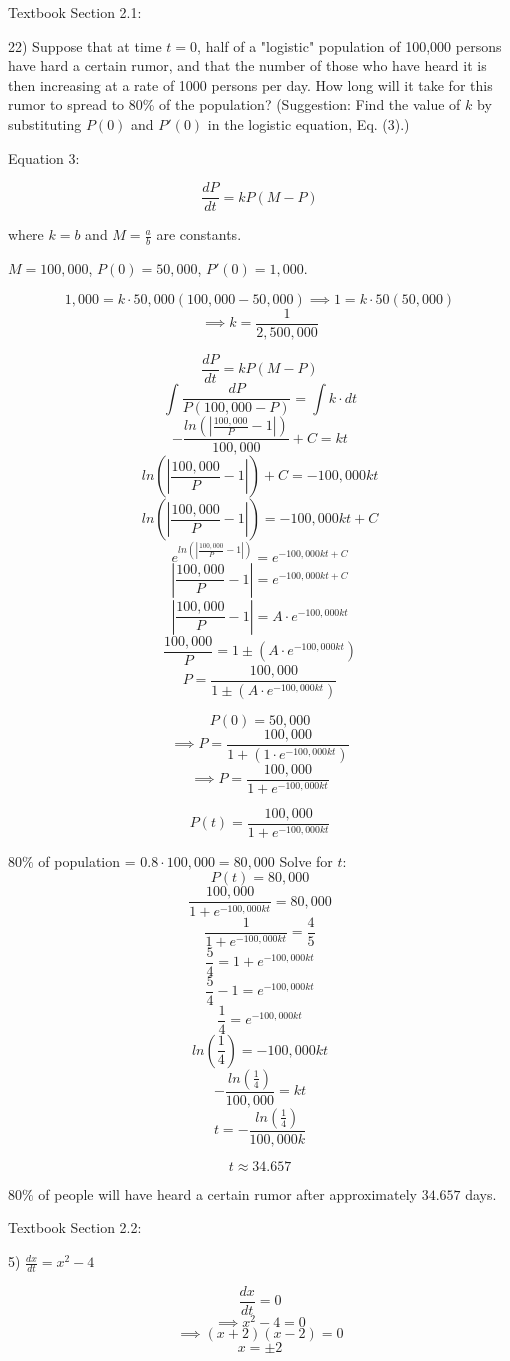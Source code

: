 \documentclass{article}
\begin{document}
Textbook Section 2.1:

22) Suppose that at time $t = 0$, half of a "logistic"
population of 100,000 persons have hard a certain rumor, and that the
number of those who have heard it is then increasing
at a rate of 1000 persons per day. How long will
it take for this rumor to spread to 80\% of the population?
(Suggestion: Find the value of $k$ by substituting
$P(0)$ and $P'(0)$ in the logistic equation, Eq. (3).)


Equation 3:

\[\frac{dP}{dt} = kP(M-P)\]

where $k = b$ and $M = \frac{a}{b}$ are constants.


$M = 100,000$, $P(0) = 50,000$, $P'(0) = 1,000$.

\[1,000 = k \cdot 50,000(100,000 - 50,000)
\implies 1 = k \cdot 50(50,000)\]
\[\implies k = \frac{1}{2,500,000}\]


\[\frac{dP}{dt} = kP(M-P)\]
\[\int \frac{dP}{P(100,000-P)} = \int k \cdot dt\]
\[-\frac{ln(|\frac{100,000}{P}-1|)}{100,000} + C = kt\]
\[ln(|\frac{100,000}{P}-1|) + C = -100,000kt\]
\[ln(|\frac{100,000}{P}-1|) = -100,000kt + C\]
\[e^{ln(|\frac{100,000}{P}-1|)} = e^{-100,000kt + C}\]
\[|\frac{100,000}{P}-1| = e^{-100,000kt + C}\]
\[|\frac{100,000}{P}-1| = A \cdot e^{-100,000kt}\]
\[\frac{100,000}{P} = 1 \pm (A \cdot e^{-100,000kt})\]
\[P = \frac{100,000}{1 \pm (A \cdot e^{-100,000kt})}\]

\[P(0) = 50,000\]
\[\implies P = \frac{100,000}{1 + (1 \cdot e^{-100,000kt})}\]
\[\implies P = \frac{100,000}{1 + e^{-100,000kt}}\]


\[P(t) = \frac{100,000}{1 + e^{-100,000kt}}\]


$80\%$ of population = $0.8 \cdot 100,000 = 80,000$
Solve for $t$:
\[P(t) = 80,000\]
\[\frac{100,000}{1 + e^{-100,000kt}} = 80,000\]
\[\frac{1}{1 + e^{-100,000kt}} = \frac{4}{5}\]
\[\frac{5}{4} = 1 + e^{-100,000kt}\]
\[\frac{5}{4} - 1 = e^{-100,000kt}\]
\[\frac{1}{4} = e^{-100,000kt}\]
\[ln(\frac{1}{4}) = -100,000kt\]
\[-\frac{ln(\frac{1}{4})}{100,000} = kt\]
\[t = -\frac{ln(\frac{1}{4})}{100,000k}\]

\[t \approx 34.657\]


$80\%$ of people will have heard a certain rumor after approximately $34.657$ days.



Textbook Section 2.2:

5) $\frac{dx}{dt} = x^2 - 4$

\[\frac{dx}{dt} = 0\]
\[\implies x^2 - 4 = 0\]
\[\implies (x+2)(x-2) = 0\]
\[x = \pm 2\]
\end{document}
